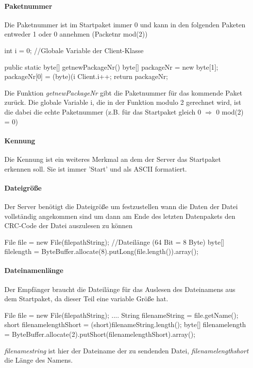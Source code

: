 \documentclass[a4paper, 12pt]{scrartcl}
\begin{document}
\paragraph{Paketnummer}
Die Paketnummer ist im Startpaket immer 0 und kann in den folgenden Paketen entweder 1 oder 0 annehmen (Packetnr mod(2))
\begin{javacode}
int i = 0; //Globale Variable der Client-Klasse

public static byte[] getnewPackageNr()
{
	byte[] packageNr = new byte[1]; 
	packageNr[0] = (byte)(i%
	Client.i++;
	return packageNr;	
}
\end{javacode}
Die Funktion \textit{getnewPackageNr} gibt die Paketnummer für das kommende Paket zurück. Die globale Variable i, die in der Funktion modulo 2 gerechnet wird, ist die dabei die echte Paketnummer (z.B. für das Startpaket gleich 0 $\Rightarrow$ 0 mod(2) = 0)

\paragraph{Kennung}
Die Kennung ist ein weiteres Merkmal an dem der Server das Startpaket erkennen soll. Sie ist immer 'Start' und als ASCII formatiert. 

\paragraph{Dateigröße}
Der Server benötigt die Dateigröße um festzustellen wann die Daten der Datei vollständig angekommen sind um dann am Ende des letzten Datenpakets den CRC-Code der Datei auszulesen zu können
\begin{javacode}
File file = new File(filepathString);
//Dateilänge (64 Bit = 8 Byte)
byte[] filelength = ByteBuffer.allocate(8).putLong(file.length()).array();
\end{javacode}
\paragraph{Dateinamenlänge}
Der Empfänger braucht die Dateilänge für das Auslesen des Dateinamens aus dem Startpaket, da dieser Teil eine variable Größe hat.
\begin{javacode}
File file = new File(filepathString);
....
String filenameString = file.getName(); 
short filenamelengthShort = (short)filenameString.length();
byte[] filenamelength = 
		ByteBuffer.allocate(2).putShort(filenamelengthShort).array();
\end{javacode}
\textit{filenamestring} ist hier der Dateiname der zu sendenden Datei, \textit{filenamelengthshort} die Länge des Namens. 
\end{document}
